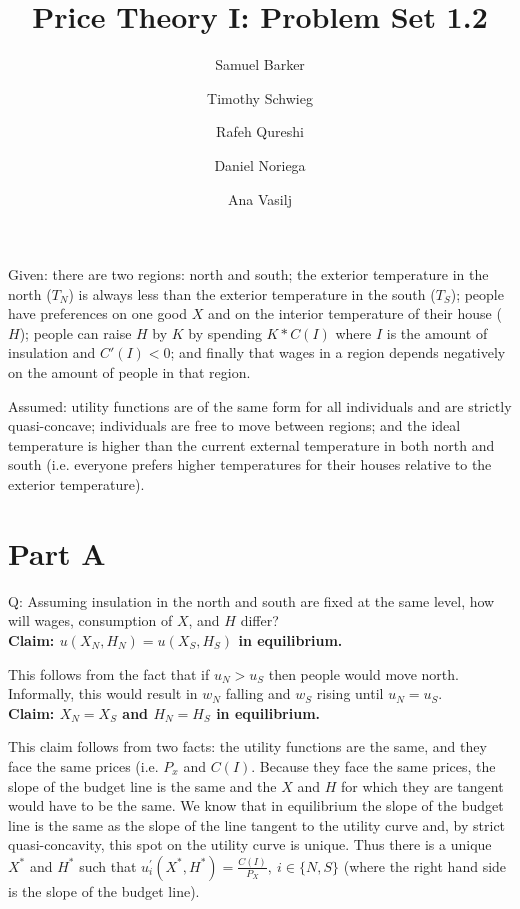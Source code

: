 \documentclass[12pt]{paper}
\title{Price Theory I: Problem Set 1.2}
\author{Samuel Barker\and Timothy Schwieg\and Rafeh Qureshi\and Daniel Noriega\and Ana Vasilj}
\begin{document}
\maketitle

Given: there are two regions: north and south; the exterior temperature in the north ($T_N$) is always less than the exterior temperature in the south ($T_S$); people have preferences on one good $X$ and on the interior temperature of their house ($H$); people can raise $H$ by $K$ by spending $K*C(I)$ where $I$ is the amount of insulation and $C'(I)<0$; and finally that wages in a region depends negatively on the amount of people in that region.

Assumed: utility functions are of the same form for all individuals and are strictly quasi-concave; individuals are free to move between regions; and the ideal temperature is higher than the current external temperature in both north and south (i.e. everyone prefers higher temperatures for their houses relative to the exterior temperature).

\section{Part A}
Q: Assuming insulation in the north and south are fixed at the same level, how will wages, consumption of $X$, and $H$ differ?
\\

\textbf{Claim: $u(X_N,H_N)=u(X_S,H_S)$ in equilibrium.}

This follows from the fact that if $u_N>u_S$ then people would move north. Informally, this would result in $w_N$ falling and $w_S$ rising until $u_N=u_S$.
\\

\textbf{Claim: $X_N=X_S$ and $H_N=H_S$ in equilibrium.}

This claim follows from two facts: the utility functions are the same, and they face the same prices (i.e. $P_x$  and $ C(I)$. Because they face the same prices, the slope of the budget line is the same and the $X$ and $H$ for which they are tangent would have to be the same. We know that in equilibrium the slope of the budget line is the same as the slope of the line tangent to the utility curve and, by strict quasi-concavity, this spot on the utility curve is unique. Thus there is a unique $X^*$ and $H^*$ such that $u^{'}_i(X^*,H^*)=\frac{C(I)}{P_X},~i\in  \{N,S\}$ (where the right hand side is the slope of the budget line).
\\
\end{document}
